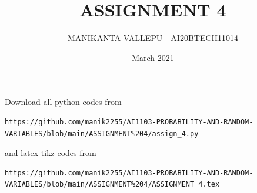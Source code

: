\documentclass[journal,12pt,twocolumn]{IEEEtran}
\date{March 2021}
\DeclareMathOperator*{\Res}{Res}
\begin{document}
\newcommand{\BEQA}{\begin{eqnarray}}
\newcommand{\EEQA}{\end{eqnarray}}
\newcommand{\define}{\stackrel{\triangle}{=}}

\raggedbottom
\setlength{\parindent}{0pt}
\providecommand{\mbf}{\mathbf}
\providecommand{\pr}[1]{\ensuremath{\Pr\left(#1\right)}}
\providecommand{\qfunc}[1]{\ensuremath{Q\left(#1\right)}}
\providecommand{\fn}[1]{\ensuremath{f\left(#1\right)}}
\providecommand{\e}[1]{\ensuremath{E\left(#1\right)}}
\providecommand{\sbrak}[1]{\ensuremath{{}\left[#1\right]}}
\providecommand{\lsbrak}[1]{\ensuremath{{}\left[#1\right.}}
\providecommand{\rsbrak}[1]{\ensuremath{{}\left.#1\right]}}
\providecommand{\brak}[1]{\ensuremath{\left(#1\right)}}
\providecommand{\lbrak}[1]{\ensuremath{\left(#1\right.}}
\providecommand{\rbrak}[1]{\ensuremath{\left.#1\right)}}
\providecommand{\cbrak}[1]{\ensuremath{\left\{#1\right\}}}
\providecommand{\lcbrak}[1]{\ensuremath{\left\{#1\right.}}
\providecommand{\rcbrak}[1]{\ensuremath{\left.#1\right\}}}
\theoremstyle{remark}
\newtheorem{rem}{Remark}
\newcommand{\sgn}{\mathop{\mathrm{sgn}}}
\providecommand{\abs}[1]{\vert#1\vert}
\providecommand{\res}[1]{\Res\displaylimits_{#1}} 
\providecommand{\norm}[1]{\lVert#1\rVert}
\providecommand{\mtx}[1]{\mathbf{#1}}
\providecommand{\mean}[1]{E[ #1 ]}
\providecommand{\fourier}{\overset{\mathcal{F}}{ \rightleftharpoons}}
\providecommand{\system}{\overset{\mathcal{H}}{ \longleftrightarrow}}
\newcommand{\solution}{\noindent \textbf{Solution: }}
\newcommand{\cosec}{\,\text{cosec}\,}
\providecommand{\dec}[2]{\ensuremath{\overset{#1}{\underset{#2}{\gtrless}}}}
\newcommand{\myvec}[1]{\ensuremath{\begin{pmatrix}#1\end{pmatrix}}}
\newcommand{\mydet}[1]{\ensuremath{\begin{vmatrix}#1\end{vmatrix}}}
\makeatletter
\vspace{3cm}
\title{ASSIGNMENT 4}
\author{MANIKANTA VALLEPU - AI20BTECH11014}
\maketitle
\newpage
\bigskip
\renewcommand{\thetable}{\theenumi}
Download all python codes from 
\begin{lstlisting}
https://github.com/manik2255/AI1103-PROBABILITY-AND-RANDOM-VARIABLES/blob/main/ASSIGNMENT%204/assign_4.py
\end{lstlisting}
%
and latex-tikz codes from 
%
\begin{lstlisting}
https://github.com/manik2255/AI1103-PROBABILITY-AND-RANDOM-VARIABLES/blob/main/ASSIGNMENT%204/ASSIGNMENT_4.tex
\end{lstlisting}
\end{document}
